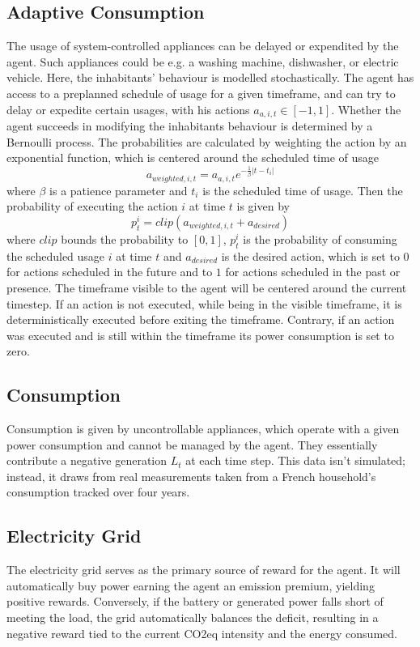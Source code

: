 \documentclass{article}
\theoremstyle{plain}
\theoremstyle{definition}
\theoremstyle{remark}
\begin{document}
\subsection{Adaptive Consumption}
The usage of system-controlled appliances can be delayed or expendited by the agent. Such appliances could be e.g. a washing machine, dishwasher, or electric vehicle. Here, the inhabitants' behaviour is modelled stochastically. The agent has access to a preplanned schedule of usage for a given timeframe, and can try to delay or expedite certain usages, with his actions $a_{a, i, t} \in  [-1,1]$. Whether the agent succeeds in modifying the inhabitants behaviour is determined by a Bernoulli process. The probabilities are calculated by weighting the action by an exponential function, which is centered around the scheduled time of usage
\begin{equation}
    a_{weighted, i, t} = a_{a, i, t} e^{-\frac{1}{\beta} |t - t_i|} 
\end{equation}
where $\beta$ is a patience parameter and $t_i$ is the scheduled time of usage. Then the probability of executing the action $i$ at time $t$ is given by
\begin{equation}
    p_t^i = clip(a_{weighted, i, t} + a_{desired})
\end{equation}
where $clip$ bounds the probability to $[0,1]$, $p_t^i$ is the probability of consuming the scheduled usage $i$ at time $t$ and $a_{desired}$ is the desired action, which is set to $0$ for actions scheduled in the future and to $1$ for actions scheduled in the past or presence.
The timeframe visible to the agent will be centered around the current timestep. If an action is not executed, while being in the visible timeframe, it is deterministically executed before exiting the timeframe. Contrary, if an action was executed and is still within the timeframe its power consumption is set to zero.

\subsection{Consumption}
Consumption is given by uncontrollable appliances, which operate with a given power consumption and cannot be managed by the agent. They essentially contribute a negative generation $L_t$ at each time step. This data isn't simulated; instead, it draws from real measurements taken from a French household's consumption tracked over four years.

\subsection{Electricity Grid}
The electricity grid serves as the primary source of reward for the agent. It will automatically buy power earning the agent an emission premium, yielding positive rewards. Conversely, if the battery or generated power falls short of meeting the load, the grid automatically balances the deficit, resulting in a negative reward tied to the current CO2eq intensity and the energy consumed.
\end{document}
